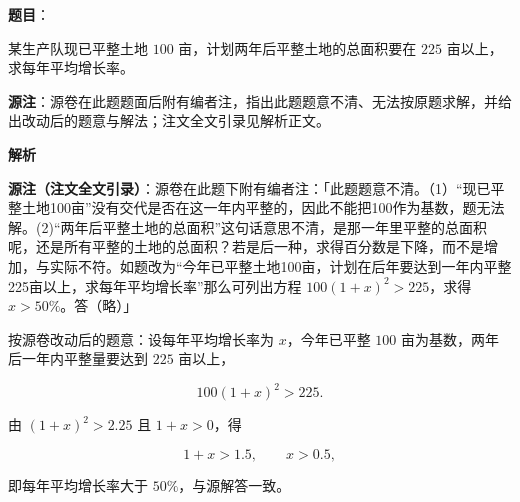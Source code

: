 \begin{answer}

\textbf{题目}：

某生产队现已平整土地 $100$ 亩，计划两年后平整土地的总面积要在 $225$ 亩以上，求每年平均增长率。

\begin{gktip}
\textbf{源注}：源卷在此题题面后附有编者注，指出此题题意不清、无法按原题求解，并给出改动后的题意与解法；注文全文引录见解析正文。
\end{gktip}

\textbf{解析}

\begin{gktip}
\textbf{源注（注文全文引录）}：源卷在此题下附有编者注：「此题题意不清。（1）“现已平整土地100亩”没有交代是否在这一年内平整的，因此不能把100作为基数，题无法解。(2)“两年后平整土地的总面积”这句话意思不清，是那一年里平整的总面积呢，还是所有平整的土地的总面积？若是后一种，求得百分数是下降，而不是增加，与实际不符。如题改为“今年已平整土地100亩，计划在后年要达到一年内平整225亩以上，求每年平均增长率”那么可列出方程 $100(1+x)^{2}>225$，求得 $x>50\%$。答（略）」
\end{gktip}

按源卷改动后的题意：设每年平均增长率为 $x$，今年已平整 $100$ 亩为基数，两年后一年内平整量要达到 $225$ 亩以上，

\nopagebreak[4]
\[
100(1+x)^{2}>225.
\]

由 $(1+x)^{2}>2.25$ 且 $1+x>0$，得

\nopagebreak[4]
\[
1+x>1.5,
\qquad
x>0.5,
\]

即每年平均增长率大于 $50\%$，与源解答一致。


\end{answer}
